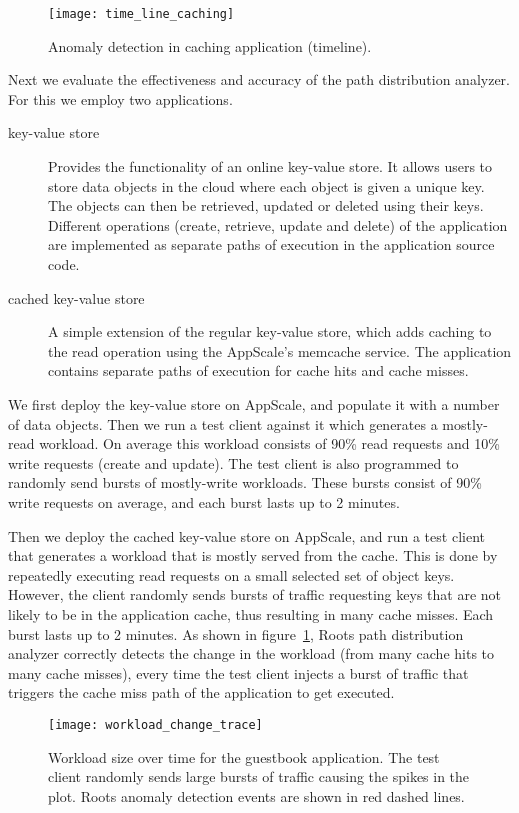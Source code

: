 \begin{figure}
\centering
\texttt{[image: time\_line\_caching]}
\caption{Anomaly detection in caching application (timeline).}
\label{fig:time_line_caching}
\end{figure}

Next we evaluate the effectiveness and accuracy of the path distribution analyzer. For this we 
employ two applications.
\begin{description}
\item[key-value store] Provides the functionality of an online key-value store.  It allows 
users to store data objects in the cloud where each object is given a unique key. The objects can then be 
retrieved, updated or deleted using their keys. Different operations
(create, retrieve, update and delete) of the application are implemented as separate paths of
execution in the application source code.
\item[cached key-value store] A simple extension of the regular key-value store, which adds
caching to the read operation using the AppScale's memcache service. The application contains
separate paths of execution for cache hits and cache misses.
\end{description}

We first deploy the key-value store on AppScale, and populate it with a number of data objects. Then we
run a test client against it which generates a mostly-read workload. On average this workload
consists of 90\% read requests and 10\% write requests (create and update). The test client
is also programmed to randomly send bursts of mostly-write workloads. These bursts consist
of 90\% write requests on average, and each burst lasts up to 2 minutes.

Then we deploy the cached key-value store on AppScale, and run a test client that generates a workload
that is mostly served from the cache. This is done by repeatedly executing read requests on a small
selected set of object keys. However, the client randomly sends bursts of traffic requesting keys that
are not likely to be in the application cache, thus resulting in many cache misses. Each burst
lasts up to 2 minutes. As shown in 
figure~\ref{fig:time_line_caching}, Roots path distribution analyzer correctly detects the change 
in the workload (from many cache hits to many cache misses), every time the test client injects a 
burst of traffic that triggers the cache miss path of the application to get executed.

\begin{figure}
\centering
\texttt{[image: workload\_change\_trace]}
\caption{Workload size over time for the guestbook application. The test client randomly sends
large bursts of traffic causing the spikes in the plot. Roots anomaly detection events are shown
in red dashed lines.}
\label{fig:workload_change}
\end{figure}

